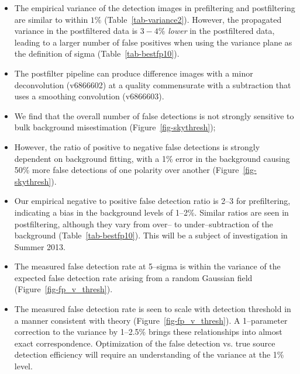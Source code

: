 \documentclass[prd, nofootinbib, floatfix, 11pt,tightenlines,times]{article}
\begin{document}
\begin{itemize}
\item The empirical variance of the detection images in prefiltering
  and postfiltering are similar to within $1\%$
  (Table~\ref{tab-variance2}).  However, the propagated variance in the
  postfiltered data is $3-4\%$ {\it lower} in the postfiltered data,
  leading to a larger number of false positives when using the
  variance plane as the definition of sigma (Table~\ref{tab-bestfp10}).



\item The postfilter pipeline can produce difference images with a
  minor deconvolution (v6866602) at a quality commensurate with a subtraction that uses a
  smoothing convolution (v6866603).


\item We find that the overall number of false detections is not
  strongly sensitive to bulk background misestimation
  (Figure~\ref{fig-skythresh});

\item However, the ratio of positive to negative false detections is
  strongly dependent on background fitting, with a 1\% error in the background
  causing 50\% more false detections of one polarity over another
  (Figure~\ref{fig-skythresh}).

\item Our empirical negative to positive false detection ratio is 2--3 for prefiltering, 
  indicating a bias in the background levels of 1--2\%.  Similar ratios are seen
  in postfiltering, although they vary from over-- to
  under--subtraction of the background
  (Table~\ref{tab-bestfp10}). This will be a subject of investigation
  in Summer 2013.


\item The measured false detection rate at 5--sigma is within the variance of the 
  expected false detection rate arising from a random Gaussian field (Figure~\ref{fig-fp_v_thresh}).

\item The measured false detection rate is seen to scale with detection
  threshold in a manner consistent with theory (Figure~\ref{fig-fp_v_thresh}).
  A 1--parameter correction to the variance by 1--2.5\% brings these relationships
  into almost exact correspondence.  Optimization of the false detection vs. true source
  detection efficiency will require an understanding of the variance at the 1\% level.


\end{itemize}
\end{document}
